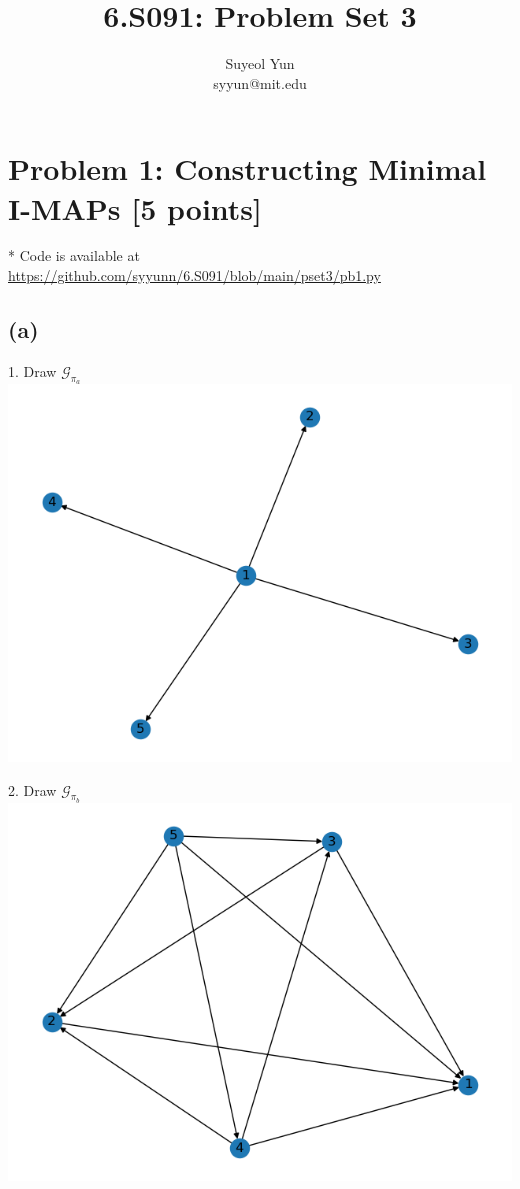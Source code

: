 \documentclass[10pt]{article}
\begin{document}
 
\title{6.S091: Problem Set 3}
\author{Suyeol Yun\\
syyun@mit.edu}
\maketitle
 
\section{Problem 1: Constructing Minimal I-MAPs [5 points]}
* Code is available at \url{https://github.com/syyunn/6.S091/blob/main/pset3/pb1.py}

\subsection{(a)} 
1. Draw $\mathcal{G}_{\pi_a}$\\

\includegraphics{images/pb1a.png}

2. Draw $\mathcal{G}_{\pi_b}$\\

\includegraphics{images/pb1b.png}
\end{document}
